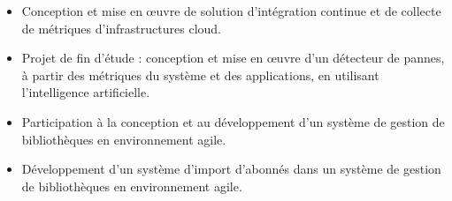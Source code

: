 \documentclass[11pt, a4paper, ragged2e]{altacv}
\begin{document}

\begin{fullwidth}
\makecvheader
\end{fullwidth}




\begin{itemize}
    \item Conception et mise en \oe{}uvre de solution d’intégration continue et de collecte de métriques d’infrastructures cloud.
    \item Projet de fin d'étude : conception et mise en \oe{}uvre d'un détecteur de pannes, à partir des métriques du système et des applications, en utilisant l'intelligence artificielle. 
\end{itemize}
\divider

\begin{itemize}
    \item Participation à la conception et au développement d'un système de gestion de bibliothèques en environnement agile.
\end{itemize}
\divider

\begin{itemize}
    \item Développement d’un système d’import d’abonnés dans un système de gestion de bibliothèques en environnement agile.
\end{itemize}
\divider
\end{document}
